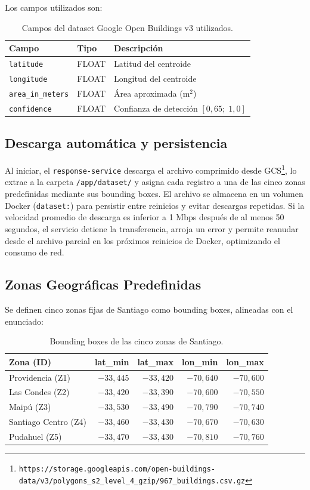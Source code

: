 \documentclass[letter,12pt]{article}
\begin{document}
Los campos utilizados son:
\begin{table}[H]
\centering
\begin{tabular}{lll}
\toprule
Campo & Tipo & Descripción \\
\midrule
\texttt{latitude} & FLOAT & Latitud del centroide \\
\texttt{longitude} & FLOAT & Longitud del centroide \\
\texttt{area\_in\_meters} & FLOAT & Área aproximada (m$^2$) \\
\texttt{confidence} & FLOAT & Confianza de detección $[0{,}65;\;1{,}0]$ \\
\bottomrule
\end{tabular}
\caption{Campos del dataset Google Open Buildings v3 utilizados.}
\end{table}

\subsection{Descarga automática y persistencia}
Al iniciar, el \texttt{response-service} descarga el archivo comprimido desde GCS\footnote{\texttt{https://storage.googleapis.com/open-buildings-data/v3/polygons\_s2\_level\_4\_gzip/967\_buildings.csv.gz}}, lo extrae a la carpeta \texttt{/app/dataset/} y asigna cada registro a una de las cinco zonas predefinidas mediante sus bounding boxes. El archivo se almacena en un volumen Docker (\texttt{dataset:}) para persistir entre reinicios y evitar descargas repetidas. Si la velocidad promedio de descarga es inferior a 1 Mbps después de al menos 50 segundos, el servicio detiene la transferencia, arroja un error y permite reanudar desde el archivo parcial en los próximos reinicios de Docker, optimizando el consumo de red.

\subsection{Zonas Geográficas Predefinidas}
Se definen cinco zonas fijas de Santiago como bounding boxes, alineadas con el enunciado:

\begin{table}[H]
\centering
\begin{tabular}{lrrrr}
\toprule
Zona (ID) & lat\_min & lat\_max & lon\_min & lon\_max \\
\midrule
Providencia (Z1) & $-33{,}445$ & $-33{,}420$ & $-70{,}640$ & $-70{,}600$ \\
Las Condes (Z2) & $-33{,}420$ & $-33{,}390$ & $-70{,}600$ & $-70{,}550$ \\
Maipú (Z3) & $-33{,}530$ & $-33{,}490$ & $-70{,}790$ & $-70{,}740$ \\
Santiago Centro (Z4) & $-33{,}460$ & $-33{,}430$ & $-70{,}670$ & $-70{,}630$ \\
Pudahuel (Z5) & $-33{,}470$ & $-33{,}430$ & $-70{,}810$ & $-70{,}760$ \\
\bottomrule
\end{tabular}
\caption{Bounding boxes de las cinco zonas de Santiago.}
\end{table}
\end{document}
